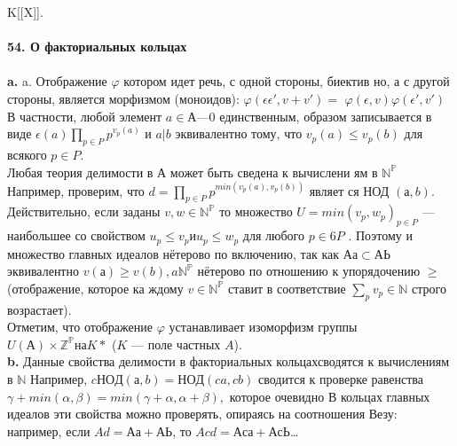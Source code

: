 K[[X]].\\
\\
\noindent\textbf{54. О факториальных кольцах}\\
\\
\hspace*{15pt}\textbf{a.} a. Отображение $\varphi$ котором идет речь, с одной стороны, биектив­\linebreak
но, а с другой стороны, является морфизмом (моноидов): $\varphi(\epsilon\epsilon',v + v') =$\linebreak
$\varphi(\epsilon,v)\varphi(\epsilon', v')$ В частности, любой элемент $a \in А — {0}$ единственным,\linebreak
образом записывается в виде $\epsilon(a) \prod_{p\in P}p^{v_{p}(a)}$ и $a | b$ эквивалентно тому,\linebreak
что $v_p(a) \leqslant v_{p}(b)$ для всякого $p \in P$.\\
\hspace*{0pt}Любая теория делимости в А может быть сведена к вычислени­\linebreak
ям в $\mathbb{N^{P}}$ Например, проверим, что $d = \prod_{p \in P} p^{min(v_{p}(a),v_{p}(b))}$ являет­\linebreak
ся НОД $(а, b)$. Действительно, если заданы $v, w \in \mathbb{N^{P}}$ то множество \linebreak
$U = min(v_p, w_p)_{p \in P}$ --- наибольшее со свойством $u_p \leqslant v_p и u_p \leqslant w_p$\linebreak
для любого $p \in6 P$ . Поэтому и множество главных идеалов нётерово \linebreak
по включению, так как $Аа \subset АЬ$ эквивалентно $v(а) \geqslant v(b), a \mathbb{N^{P}}$\linebreak
нётерово по отношению к упорядочению $\geqslant$ (отображение, которое ка­\linebreak
ждому $v \in \mathbb{N^{P}}$ ставит в соответствие $\sum_{p}v_p \in \mathbb{N}$ строго возрастает).\\
\hspace*{0pt} Отметим, что отображение $\varphi$ устанавливает изоморфизм группы\linebreak
$U(А) \times \mathbb{Z^{P}} на K*$ ($K$ — поле частных $A$).\\
\hspace*{15pt}\textbf{b.} Данные свойства делимости в факториальных кольцах\linebreak сводятся
к вычислениям в $\mathbb{N}$ Например, $cНОД(а, b) = НОД (ca,cb)$ сводится к\linebreak
проверке равенства $\gamma+min(\alpha, \beta) = min(\gamma+\alpha, \alpha+\beta),$ которое очевидно\linebreak
В кольцах главных идеалов эти свойства можно проверять, опираясь на\linebreak
соотношения Везу: например, если $Ad = Аа+АЬ$, то $Acd = Аса+АсЬ$\ldots

